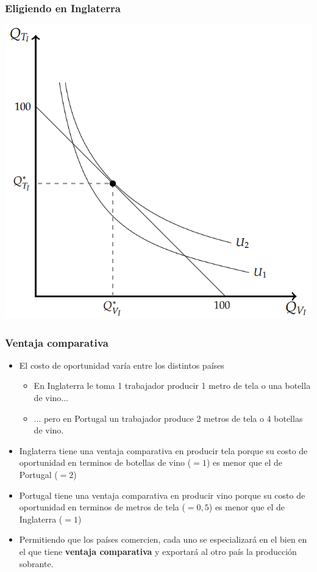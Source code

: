 \documentclass{beamer}
\begin{document}
\begin{frame}
\frametitle{Eligiendo en Inglaterra}
\centering
\includegraphics[scale=0.6]{../Figures/C18.5.png}
\end{frame}

\begin{frame}
    \frametitle{Ventaja comparativa}
    \begin{itemize}
        \item El costo de oportunidad varía entre los distintos países
        \begin{itemize}
            \item En Inglaterra le toma 1 trabajador producir 1 metro de tela o una botella de vino...
            \item ... pero en Portugal un trabajador produce 2 metros de tela o 4 botellas de vino.
        \end{itemize}
        \item Inglaterra tiene una ventaja comparativa en producir tela porque su costo de oportunidad en terminos de botellas de vino ($=1$) es menor que el de Portugal ($=2$)
        \item Portugal tiene una ventaja comparativa en producir vino porque su costo de oportunidad en terminos de metros de tela ($=0,5$) es menor que el de Inglaterra ($=1$)
        \item Permitiendo que los países comercien, cada uno se especializará en el bien en el que tiene \textbf{ventaja comparativa} y exportará al otro país la producción sobrante.
    \end{itemize}
\end{frame}
\end{document}
